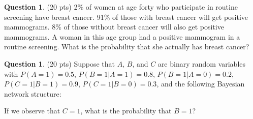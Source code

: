 \documentclass{article}
\theoremstyle{definition}
\newtheorem{question}[thm]{Question}
\begin{document}

\begin{question} (20 pts)
    2\% of women at age forty who participate in routine screening have breast cancer. 91\% of those with breast cancer will get positive mammograms. 8\% of those without breast cancer will also get positive mammograms. A woman in this age group had a positive mammogram in a routine screening. What is the probability that she actually has breast cancer?
\end{question}

\begin{question} (20 pts) Suppose that $A$, $B$, and $C$ are binary random variables with $P(A=1) = 0.5$, $P(B=1|A=1) = 0.8$, $P(B=1|A=0) = 0.2$, $P(C=1|B=1) = 0.9$, $P(C=1|B=0) = 0.3$, and the following Bayesian network structure:
    \begin{center}
    \end{center}
If we observe that $C=1$, what is the probability that $B=1$?
\end{question}
\end{document}

